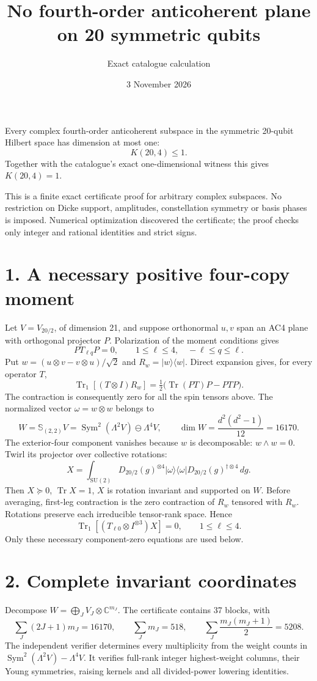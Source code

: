 \documentclass[11pt]{article}
\newcommand{\Tr}{\operatorname{Tr}}\newcommand{\Sym}{\operatorname{Sym}}
\begin{document}
\title{No fourth-order anticoherent plane on 20 symmetric qubits}
\author{Exact catalogue calculation}\date{3 November 2026}\maketitle
\begin{theorem}
Every complex fourth-order anticoherent subspace in the symmetric 20-qubit Hilbert space has dimension at most one:
\[\boxed{K(20,4)\le1.}\]
Together with the catalogue's exact one-dimensional witness this gives $K(20,4)=1$.
\end{theorem}
This is a finite exact certificate proof for arbitrary complex subspaces. No restriction on Dicke support, amplitudes, constellation symmetry or basis phases is imposed. Numerical optimization discovered the certificate; the proof checks only integer and rational identities and strict signs.

\section*{1. A necessary positive four-copy moment}
Let $V=V_{20/2}$, of dimension 21, and suppose orthonormal $u,v$ span an AC4 plane with orthogonal projector $P$. Polarization of the moment conditions gives
\[PT_{\ell q}P=0,\qquad 1\le\ell\le4,\quad -\ell\le q\le\ell.\]
Put $w=(u\otimes v-v\otimes u)/\sqrt2$ and $R_w=|w\rangle\langle w|$. Direct expansion gives, for every operator $T$,
\[\Tr_1[(T\otimes I)R_w]=\tfrac12\bigl(\Tr(PT)P-PTP\bigr).\]
The contraction is consequently zero for all the spin tensors above. The normalized vector $\omega=w\otimes w$ belongs to
\[W=\mathbb S_{(2,2)}V=\Sym^2(\Lambda^2V)\ominus\Lambda^4V,\qquad \dim W=\frac{d^2(d^2-1)}{12}=16170.\]
The exterior-four component vanishes because $w$ is decomposable: $w\wedge w=0$. Twirl its projector over collective rotations:
\[X=\int_{\mathrm{SU}(2)}D_{20/2}(g)^{\otimes4}|\omega\rangle\langle\omega|D_{20/2}(g)^{\dagger\otimes4}\,dg.\]
Then $X\succeq0$, $\Tr X=1$, $X$ is rotation invariant and supported on $W$. Before averaging, first-leg contraction is the zero contraction of $R_w$ tensored with $R_w$. Rotations preserve each irreducible tensor-rank space. Hence
\begin{equation}\label{eq:zero}\Tr_1[(T_{\ell0}\otimes I^{\otimes3})X]=0,\qquad1\le\ell\le4.\end{equation}
Only these necessary component-zero equations are used below.

\section*{2. Complete invariant coordinates}
Decompose $W=\bigoplus_J V_J\otimes\mathbb C^{m_J}$. The certificate contains 37 blocks, with
\[\sum_J(2J+1)m_J=16170,\qquad\sum_Jm_J=518,\qquad\sum_J\frac{m_J(m_J+1)}2=5208.\]
The independent verifier determines every multiplicity from the weight counts in $\Sym^2(\Lambda^2V)-\Lambda^4V$. It verifies full-rank integer highest-weight columns, their Young symmetries, raising kernels and all divided-power lowering identities.
\end{document}

